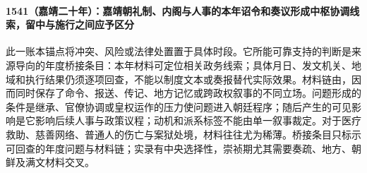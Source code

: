 \paragraph{1541（嘉靖二十年）：嘉靖朝礼制、内阁与人事的本年诏令和奏议形成中枢协调线索，留中与施行之间应予区分} 此一账本锚点将冲突、风险或法律处置置于具体时段。它所能可靠支持的判断是来源导向的年度桥接条目：本年材料可定位相关政务线索；具体月日、发文机关、地域和执行结果仍须逐项回查，不能以制度文本或奏报替代实际效果。材料链由，因而同时保存了命令、报送、传记、地方记忆或跨政权叙事的不同立场。问题形成的条件是继承、官僚协调或皇权运作的压力使问题进入朝廷程序；随后产生的可见影响是它影响后续人事与政策议程；动机和派系标签不能由单一叙事裁定。对于医疗救助、慈善网络、普通人的伤亡与案狱处境，材料往往尤为稀薄。桥接条目只标示可回查的年度问题与材料链；实录有中央选择性，崇祯期尤其需要奏疏、地方、朝鲜及满文材料交叉。
